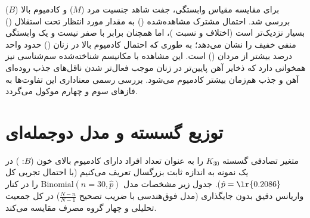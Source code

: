 \documentclass[12pt]{exam}
\begin{document}
برای مقایسه مقیاس وابستگی، جفت شاهد جنسیت مرد ($M$) و کادمیوم بالا ($B$) بررسی شد. احتمال مشترک مشاهده‌شده () به مقدار مورد انتظار تحت استقلال () بسیار نزدیک‌تر است (اختلاف  و نسبت )، اما همچنان برابر با صفر نیست و یک وابستگی منفی خفیف را نشان می‌دهد؛ به طوری که احتمال کادمیوم بالا در زنان () حدود  واحد درصد بیشتر از مردان () است. این مشاهده با مکانیسم شناخته‌شده سم‌شناسی نیز همخوانی دارد که ذخایر آهن پایین‌تر در زنان موجب فعال‌تر شدن ناقل‌های جذب روده‌ای آهن و جذب هم‌زمان بیشتر کادمیوم می‌شود. بررسی رسمی معناداری این تفاوت‌ها به فازهای سوم و چهارم موکول می‌گردد.


\section{توزیع گسسته و مدل دوجمله‌ای}

متغیر تصادفی گسسته $K_{30}$ را به عنوان تعداد افراد دارای کادمیوم بالای خون ($B$: ) در یک نمونه به اندازه ثابت  بزرگسال تعریف می‌کنیم (با احتمال تجربی کل $\hat{p} = \text{\lr{0.2086}}$). جدول زیر مشخصات مدل $\text{Binomial}(n=30, \hat{p})$ را در کنار واریانس دقیق بدون جایگذاری (مدل فوق‌هندسی با ضریب تصحیح $\frac{N-n}{N-1}$) در کل جمعیت تحلیلی و چهار گروه مصرف مقایسه می‌کند.

\begin{table}[htbp]
\centering
\caption{مشخصات مدل $\text{Binomial}(n=30, \hat{p})$ برای شمارش کادمیوم بالا ($B$) و مقایسه واریانس با مدل فوق‌هندسی}
\end{table}
\end{document}
